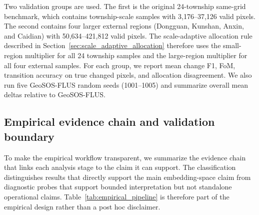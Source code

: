 \documentclass{article}
\begin{document}
Two validation groups are used. The first is the original 24-township same-grid benchmark, which contains township-scale samples with 3,176--37,126 valid pixels. The second contains four larger external regions (Dongguan, Kunshan, Anxin, and Caidian) with 50,634--421,812 valid pixels. The scale-adaptive allocation rule described in Section~\ref{sec:scale_adaptive_allocation} therefore uses the small-region multiplier for all 24 township samples and the large-region multiplier for all four external samples. For each group, we report mean change F1, FoM, transition accuracy on true changed pixels, and allocation disagreement. We also run five GeoSOS-FLUS random seeds (1001--1005) and summarize overall mean deltas relative to GeoSOS-FLUS.

\subsection{Empirical evidence chain and validation boundary}
\label{sec:evidence_chain}

To make the empirical workflow transparent, we summarize the evidence chain that links each analysis stage to the claim it can support. The classification distinguishes results that directly support the main embedding-space claim from diagnostic probes that support bounded interpretation but not standalone operational claims. Table~\ref{tab:empirical_pipeline} is therefore part of the empirical design rather than a post hoc disclaimer.
\end{document}

